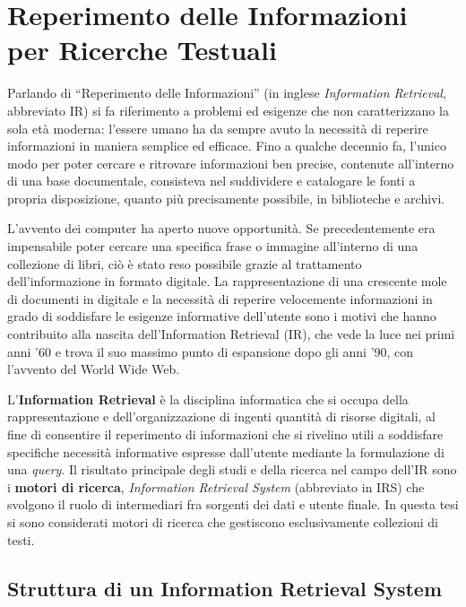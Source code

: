 
\chapter{Reperimento delle Informazioni per Ricerche Testuali}


Parlando di “Reperimento delle Informazioni” (in inglese \textit{Information Retrieval}, abbreviato IR) si fa riferimento a problemi ed esigenze che non caratterizzano la sola età moderna: l’essere umano ha da sempre avuto la necessità di reperire informazioni in maniera semplice ed efficace. Fino a qualche decennio fa, l’unico modo per poter cercare e ritrovare informazioni ben precise, contenute all’interno di una base documentale, consisteva nel suddividere e catalogare le fonti a propria disposizione, quanto più precisamente possibile, in biblioteche e archivi.

\vspace{1em}

L’avvento dei computer ha aperto nuove opportunità. Se precedentemente era impensabile poter cercare una specifica frase o immagine all’interno di una collezione di libri, ciò è stato reso possibile grazie al trattamento dell’informazione in formato digitale. La rappresentazione di una crescente mole di documenti in digitale e la necessità di reperire velocemente informazioni in grado di soddisfare le esigenze informative dell’utente sono i motivi che hanno contribuito alla nascita dell’Information Retrieval (IR), che vede la luce nei primi anni ’60 e trova il suo massimo punto di espansione dopo gli anni ’90, con l’avvento del World Wide Web.

\vspace{1em}

L’\textbf{Information Retrieval} è la disciplina informatica che si occupa della rappresentazione e dell’organizzazione di ingenti quantità di risorse digitali, al fine di consentire il reperimento di informazioni che si rivelino utili a soddisfare specifiche necessità informative espresse dall’utente mediante la formulazione di una \textit{query}. Il risultato principale degli studi e della ricerca nel campo dell’IR sono i \textbf{motori di ricerca}, \textit{Information Retrieval System} (abbreviato in IRS) che svolgono il ruolo di intermediari fra sorgenti dei dati e utente finale. In questa tesi si sono considerati motori di ricerca che gestiscono esclusivamente collezioni di testi.
\pagebreak




\section{Struttura di un Information Retrieval System}

